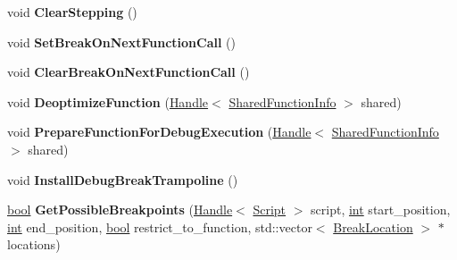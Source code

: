 \begin{DoxyCompactItemize}
\item 
\mbox{\label{classv8_1_1internal_1_1Debug_adcd9304fbc680273541c9a4d78109dab}} 
void {\bfseries Clear\+Stepping} ()
\item 
\mbox{\label{classv8_1_1internal_1_1Debug_a9f52a7995abb230731c30d4d874cc46d}} 
void {\bfseries Set\+Break\+On\+Next\+Function\+Call} ()
\item 
\mbox{\label{classv8_1_1internal_1_1Debug_adf425ef5a8623c28f6eca2a1196f2c43}} 
void {\bfseries Clear\+Break\+On\+Next\+Function\+Call} ()
\item 
\mbox{\label{classv8_1_1internal_1_1Debug_a3cd432149cea70fb5bdafc23acc7e074}} 
void {\bfseries Deoptimize\+Function} (\mbox{\hyperlink{classv8_1_1internal_1_1Handle}{Handle}}$<$ \mbox{\hyperlink{classv8_1_1internal_1_1SharedFunctionInfo}{Shared\+Function\+Info}} $>$ shared)
\item 
\mbox{\label{classv8_1_1internal_1_1Debug_a627cb79298f7eea02b5a09708f31fb77}} 
void {\bfseries Prepare\+Function\+For\+Debug\+Execution} (\mbox{\hyperlink{classv8_1_1internal_1_1Handle}{Handle}}$<$ \mbox{\hyperlink{classv8_1_1internal_1_1SharedFunctionInfo}{Shared\+Function\+Info}} $>$ shared)
\item 
\mbox{\label{classv8_1_1internal_1_1Debug_acbc48a3bc76790c129838edd55fe3c3e}} 
void {\bfseries Install\+Debug\+Break\+Trampoline} ()
\item 
\mbox{\label{classv8_1_1internal_1_1Debug_a74b0df5dab4c42b5aca8daacf23a00d3}} 
\mbox{\hyperlink{classbool}{bool}} {\bfseries Get\+Possible\+Breakpoints} (\mbox{\hyperlink{classv8_1_1internal_1_1Handle}{Handle}}$<$ \mbox{\hyperlink{classv8_1_1internal_1_1Script}{Script}} $>$ script, \mbox{\hyperlink{classint}{int}} start\+\_\+position, \mbox{\hyperlink{classint}{int}} end\+\_\+position, \mbox{\hyperlink{classbool}{bool}} restrict\+\_\+to\+\_\+function, std\+::vector$<$ \mbox{\hyperlink{classv8_1_1internal_1_1BreakLocation}{Break\+Location}} $>$ $\ast$locations)
\item 
\mbox{\label{classv8_1_1internal_1_1Debug_ae1e97c913629beb0fb908bcc802d581b}} 

\end{DoxyCompactItemize}
